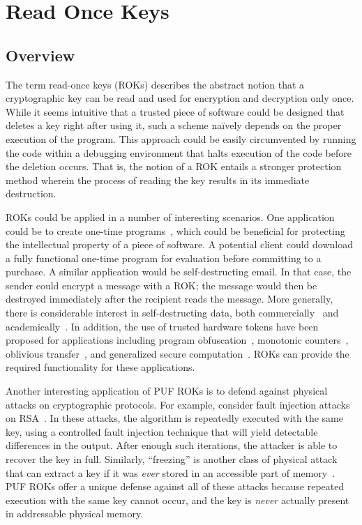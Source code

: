 
\chapter{Read Once Keys}
\label{chapter:rok}

\section{Overview}
The term read-once keys (ROKs) describes the abstract notion that a cryptographic key can be read and used for encryption
and decryption only once. While it seems intuitive that a trusted piece of software could be designed that deletes a key right after
using it, such a scheme na\"{i}vely depends on the proper execution of the program. This approach could be easily
circumvented by running the code within a debugging environment that halts execution of the code before the deletion occurs.
That is, the notion of a ROK entails a stronger protection method wherein the process of reading the key 
results in its immediate destruction.

ROKs could be applied in a number of interesting scenarios. One application could be to create one-time programs~\cite{otp},
which could be beneficial for protecting the intellectual property of a piece of software. A potential client
could download a fully functional one-time program for evaluation before committing to a purchase.  A similar application
would be self-destructing email.  In that case, the sender could encrypt a message with a ROK; the message would then
be destroyed immediately after the recipient reads the message.  More generally, there is considerable interest in self-destructing
data, both commercially~\cite{ironkey} and academically~\cite{vanish}.  In addition, the use of trusted hardware tokens have been
proposed for applications including program obfuscation~\cite{obfusc}, monotonic counters~\cite{monotonictpm}, oblivious
transfer~\cite{ottamper}, and generalized secure computation~\cite{tamperhw}.  ROKs can provide the required functionality
for these applications.

Another interesting application of PUF ROKs is to defend against physical attacks on cryptographic protocols.  For example,
consider fault injection attacks on RSA~\cite{rsapub,pertrsa,insecrsa,rsaltr,fault}.  In these attacks, the algorithm is repeatedly executed
with the same key, using a controlled fault injection technique that will yield detectable differences in the output.  After enough such
iterations, the attacker is able to recover the key in full.  Similarly, ``freezing'' is another class of physical attack
that can extract a key if it was \emph{ever} stored in an accessible part of memory~\cite{freezing}.  PUF ROKs offer a unique defense against
all of these attacks because repeated execution with the same key cannot occur, and the key is \emph{never} actually present
in addressable physical memory.

